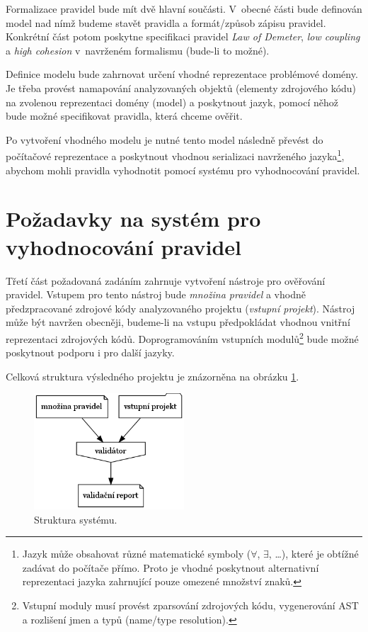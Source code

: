 Formalizace pravidel bude mít dvě hlavní součásti. V~obecné části bude definován model nad nímž budeme stavět pravidla a formát/způsob zápisu pravidel. Konkrétní část potom poskytne specifikaci pravidel \emph{Law of Demeter}, \emph{low coupling} a \emph{high cohesion} v~navrženém formalismu (bude-li to možné).

Definice modelu bude zahrnovat určení vhodné reprezentace problémové domény. Je třeba provést namapování analyzovaných objektů (elementy zdrojového kódu) na zvolenou reprezentaci domény (model) a poskytnout jazyk, pomocí něhož bude možné specifikovat pravidla, která chceme ověřit.

Po vytvoření vhodného modelu je nutné tento model následně převést do počítačové reprezentace a poskytnout vhodnou serializaci navrženého jazyka\footnote{Jazyk může obsahovat různé matematické symboly ($\forall$, $\exists$, \ldots), které je obtížné zadávat do počítače přímo. Proto je vhodné poskytnout alternativní reprezentaci jazyka zahrnující pouze omezené množství znaků.}, abychom mohli pravidla vyhodnotit pomocí systému pro vyhodnocování pravidel.

\section{Požadavky na systém pro vyhodnocování pravidel}
\label{requirements-rules_evaluation}
Třetí část požadovaná zadáním zahrnuje vytvoření nástroje pro ověřování pravidel. Vstupem pro tento nástroj bude \emph{množina pravidel} a vhodně předzpracované zdrojové kódy analyzovaného projektu (\emph{vstupní projekt}). Nástroj může být navržen obecněji, budeme-li na vstupu předpokládat vhodnou vnitřní reprezentaci zdrojových kódů. Doprogramováním vstupních modulů\footnote{Vstupní moduly musí provést zparsování zdrojových kódu, vygenerování AST a rozlišení jmen a typů (name/type resolution).} bude možné poskytnout podporu i pro další jazyky.

Celková struktura výsledného projektu je znázorněna na obrázku \ref{requirements-system_structure}.

\begin{figure}[h!]
  \centering
  \includegraphics[width=0.5\textwidth]{./graphs/global_structure.png}
  \caption{Struktura systému.\label{requirements-system_structure}}
\end{figure}

